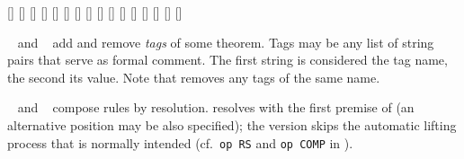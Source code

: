 \begin{isabellebody}
\begin{isamarkuptext}
  \begin{railoutput}
[]
[]
[]
\rail@end
{}
[]
[]
\rail@end
{}
\rail@bar
{}[]
[]
\rail@endbar
\rail@bar
{}
[]
[]
[]
\rail@endbar
{}[]
\rail@end
{}
\rail@bar
{}[]
[]
\rail@endbar
{}[]
\rail@end
{}
[]
\rail@bar
{}
[]
\rail@endbar
\rail@end
\end{railoutput}


  \begin{description}

  \item \hyperlink{attribute.tagged}{\mbox{}}~ and \hyperlink{attribute.untagged}{\mbox{}}~ add and remove \emph{tags} of some theorem.
  Tags may be any list of string pairs that serve as formal comment.
  The first string is considered the tag name, the second its value.
  Note that \hyperlink{attribute.untagged}{\mbox{}} removes any tags of the same name.

  \item \hyperlink{attribute.THEN}{\mbox{}}~ and \hyperlink{attribute.COMP}{\mbox{}}~
  compose rules by resolution.  \hyperlink{attribute.THEN}{\mbox{}} resolves with the
  first premise of  (an alternative position may be also
  specified); the \hyperlink{attribute.COMP}{\mbox{}} version skips the automatic
  lifting process that is normally intended (cf.\ \verb|op RS| and
  \verb|op COMP| in \cite{isabelle-implementation}).
  

\end{description}
\end{isamarkuptext}
\end{isabellebody}
